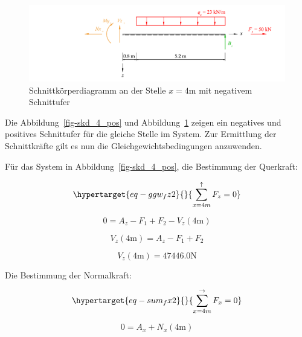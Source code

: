 \documentclass[
  12pt,
  letterpaper,
  DIV=11,
  egregdoesnotlikesansseriftitles]{scrartcl}
\begin{document}
\begin{figure}[H]

{\centering \includegraphics{BSI_HS23_Testat_01_files/mediabag/../images/Testat_01_HS23_SKD_2.pdf}

}

\caption{\label{fig-skd_4_neg}Schnittkörperdiagramm an der Stelle
\(x=4\)m mit negativem Schnittufer}

\end{figure}

Die Abbildung~\ref{fig-skd_4_pos} und Abbildung~\ref{fig-skd_4_neg}
zeigen ein negatives und positives Schnittufer für die gleiche Stelle im
System. Zur Ermittlung der Schnittkräfte gilt es nun die
Gleichgewichtsbedingungen anzuwenden.

Für das System in Abbildung~\ref{fig-skd_4_pos}, die Bestimmung der
Querkraft:

\begin{equation}\protect\hypertarget{eq-ggw_fz2}{}{
\sum_{x=4m}^\uparrow F_z = 0
}\label{eq-ggw_fz2}\end{equation}

\begin{equation}0 = A_{z} - F_{1} + F_{2} - V_{z}{\left(4 \text{m} \right)}\end{equation}

\begin{equation}V_{z}{\left(4 \text{m} \right)} = A_{z} - F_{1} + F_{2}\end{equation}

\begin{equation}V_{z}{\left(4 \text{m} \right)} = 47446.0 \text{N}\end{equation}

Die Bestimmung der Normalkraft:

\begin{equation}\protect\hypertarget{eq-sum_fx2}{}{
\sum_{x=4m}^\rightarrow F_x = 0
}\label{eq-sum_fx2}\end{equation}

\begin{equation}0 = A_{x} + N_{x}{\left(4 \text{m} \right)}\end{equation}
\end{document}
